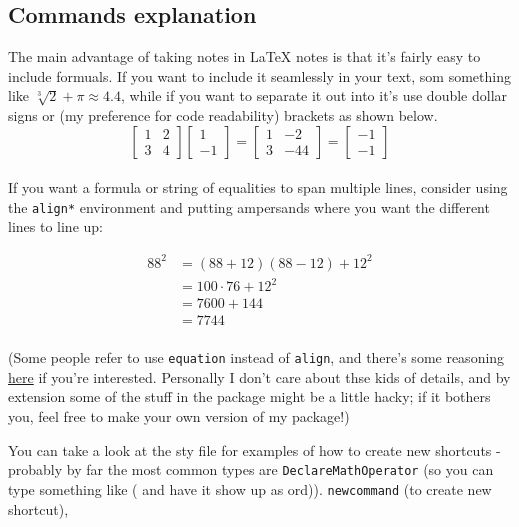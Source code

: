 \documentclass[11pt]{article}
\begin{document}
\subsection{Commands explanation}
The main advantage of taking notes in LaTeX notes is that it's fairly easy to
include formuals. If you want to include it seamlessly in your text, som
something like \(\sqrt[3]{2} + \pi \approx 4.4\), while if you want to separate
it out into it's use double dollar signs or (my preference for code
readability) brackets as shown below. \\
\[
    \begin{bmatrix}
        1 & 2 \\
        3 & 4
    \end{bmatrix}
    \begin{bmatrix}
        1 \\
        -1
    \end{bmatrix}
    =
    \begin{bmatrix}
        1 & -2  \\
        3 & -44
    \end{bmatrix}
    =
    \begin{bmatrix}
        -1 \\
        -1
    \end{bmatrix}
\]
\\
If you want a formula or string of equalities to span multiple lines, consider using the \texttt{align*} environment and putting ampersands where you want the different lines to line up:

\begin{align*}
    88^2 & = (88 + 12)(88 - 12) + 12^2 \\
         & = 100 \cdot 76 + 12^2       \\
         & = 7600 + 144                \\
         & = 7744                      \\
\end{align*}

(Some people refer to use \texttt{equation} instead of \texttt{align}, and there's some reasoning \href{https://tex.stackexchange.com/questions/196/eqnarray-vs-align}{here} if you're interested. Personally I don't care about thse kids of details, and by extension some of the stuff in the package might be a little hacky; if it bothers you, feel free to make your own version of my package!)

You can take a look at the sty file for examples of how to create new shortcuts - probably by far the most common types are \texttt{DeclareMathOperator} (so you can type something like (\texttt{\ord} and have it show up as ord)). \texttt{newcommand} (to create new shortcut),  
\end{document}
